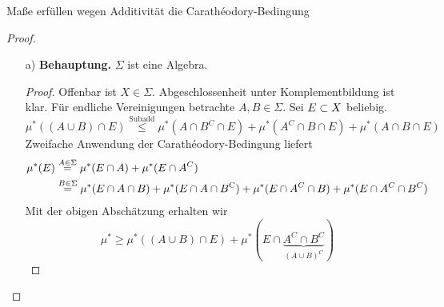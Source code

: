 \documentclass[skript.tex]{subfiles}
\begin{document}
	\begin{bem*}
		Maße erfüllen wegen Additivität die Carathéodory-Bedingung
	\end{bem*}

	\begin{proof}\hfill
	\begin{itemize}
		\item[a)] \textbf{Behauptung.} $\Sigma$ ist eine Algebra.
			\begin{proof}
				Offenbar ist $X\in\Sigma$. Abgeschlossenheit unter Komplementbildung ist klar. Für endliche Vereinigungen betrachte $A,B\in\Sigma$. Sei $E \subset X$ beliebig.
				\begin{equation*}
					\mu^*((A \cup B)\cap E) \stackrel{\text{Subadd}}\leq \mu^*(A\cap B^C \cap E)+ \mu^*(A^C \cap B \cap E) + \mu^*(A \cap B \cap E)
				\end{equation*}
				Zweifache Anwendung der Carathéodory-Bedingung liefert
				\begin{align*}
					\mu^*(E)&\stackrel{A\in\Sigma}{=}\mu^*(E\cap A)+\mu^*(E\cap A^C) \\
					&\stackrel{B\in\Sigma}{=}\mu^*(E\cap A\cap B)+ \mu^*(E\cap A\cap B^\mathrm{C})+\mu^*(E\cap A^C\cap B)+\mu^*(E\cap A^C\cap B^C)
				\end{align*}
				Mit der obigen Abschätzung erhalten wir
				\begin{equation*}
					\mu^*\geq\mu^*((A\cup B)\cap E)+ \mu^*(E\cap \underbrace{A^C\cap B^C}_{(A\cup B)^C})
				\end{equation*}
			\end{proof}


\end{itemize}
\end{proof}
\end{document}
